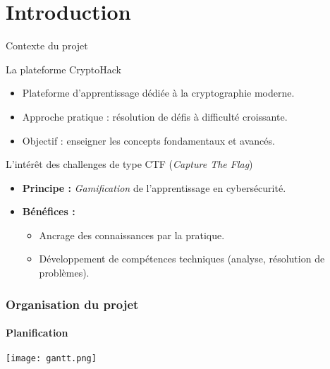 
\section{Introduction}

\begin{frame}{Contexte du projet}

    \begin{block}{La plateforme CryptoHack}
        \begin{itemize}
            \item Plateforme d'apprentissage dédiée à la cryptographie moderne.
            \item Approche pratique : résolution de défis à difficulté croissante.
            \item Objectif : enseigner les concepts fondamentaux et avancés.
        \end{itemize}
    \end{block}

    \vspace{0.5cm}

    \begin{alertblock}{L'intérêt des challenges de type CTF (\textit{Capture The Flag})}
        \begin{itemize}
            \item \textbf{Principe :} \textit{Gamification} de l'apprentissage en cybersécurité.
            \item \textbf{Bénéfices :}
                \begin{itemize}
                    \item Ancrage des connaissances par la pratique.
                    \item Développement de compétences techniques (analyse, résolution de problèmes).
                \end{itemize}
        \end{itemize}
    \end{alertblock}

\end{frame}

\begin{frame}
    \frametitle{Organisation du projet}
    \framesubtitle{Planification}
    \centering
    \texttt{[image: gantt.png]}
\end{frame}

